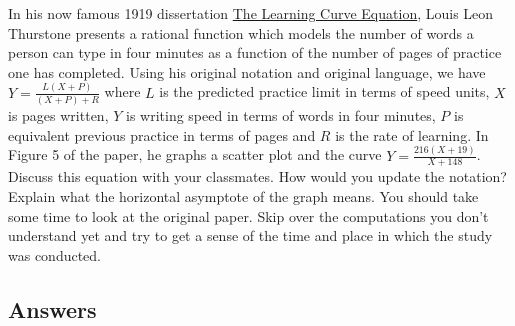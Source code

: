 \begin{exenum}
\item {}  In his now famous 1919 dissertation \uline{The Learning Curve Equation}, Louis Leon Thurstone presents a rational function which models the number of words a person can type in four minutes as a function of the number of pages of practice one has completed.
Using his original notation and original language, we have $Y = \frac{L(X + P)}{(X + P) + R}$ where $L$ is the predicted practice limit in terms of speed units, $X$ is pages written, $Y$ is writing speed in terms of words in four minutes, $P$ is equivalent previous practice in terms of pages and $R$ is the rate of learning. In Figure 5 of the paper, he graphs a scatter plot and the curve $Y = \frac{216(X + 19)}{X + 148}$.  Discuss this equation with your classmates.  How would you update the notation?  Explain what the horizontal asymptote of the graph means.  You should take some time to look at the original paper. Skip over the computations you don't understand yet and try to get a sense of the time and place in which the study was conducted.

\end{exenum}

\clearpage

\subsection{Answers}
\startexenum

